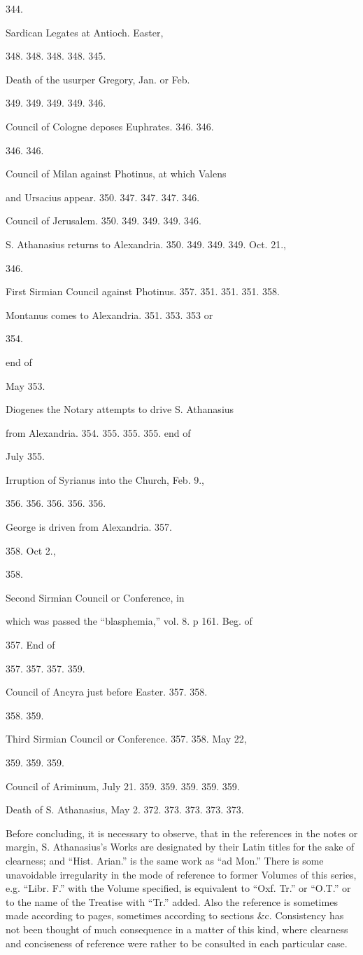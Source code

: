 344.

Sardican
Legates at Antioch.
Easter,

348.
348.
348.
348.
345.

Death of the
usurper Gregory,
Jan. or
Feb.

349.
349.
349.
349.
346.

Council of
Cologne deposes Euphrates.
346.
346.

346.
346.

Council of
Milan against Photinus, at which Valens 

and
Ursacius appear.
350.
347.
347.
347.
346.

Council of
Jerusalem.
350.
349.
349.
349.
346.

S. Athanasius
returns to Alexandria.
350.
349.
349.
349.
Oct. 21.,

346.

First Sirmian
Council against Photinus.
357.
351.
351.
351.
358.

Montanus
comes to Alexandria.
351.
353.
353 or

354.

end of

May 353.

Diogenes
the Notary attempts to drive S. Athanasius

from
Alexandria.
354.
355.
355.
355.
end of

July 355.

Irruption of
Syrianus into the Church,
Feb. 9.,

356.
356.
356.
356.
356.

George is
driven from Alexandria.
357.

358.
Oct 2.,

358.

Second
Sirmian Council or Conference, in

which was passed
the “blasphemia,” vol. 8. p 161.
Beg. of

357.
End of

357.
357.
357.
359.

Council of
Ancyra just before Easter.
357.
358.

358.
359.

Third Sirmian
Council or Conference.
357.
358.
May 22, 

359.
359.
359.

Council of
Ariminum, July 21.
359.
359.
359.
359.
359.

Death of S.
Athanasius, May 2.
372.
373.
373.
373.
373.

Before concluding, it is
necessary to observe, that in the references in the notes or margin,
S. Athanasius's Works are designated by their Latin titles for the
sake of clearness; and “Hist. Arian.” is the same work as “ad
Mon.” There is some unavoidable irregularity in the mode of
reference to former Volumes of this series, e.g. “Libr. F.” with
the Volume specified, is equivalent to “Oxf. Tr.'' or “O.T.”
or to the name of the Treatise with “Tr.” added. Also the
reference is sometimes made according to pages, sometimes according to
sections \&c. Consistency has not been thought of much consequence
in a matter of this kind, where clearness and conciseness of reference
were rather to be consulted in each particular case.

